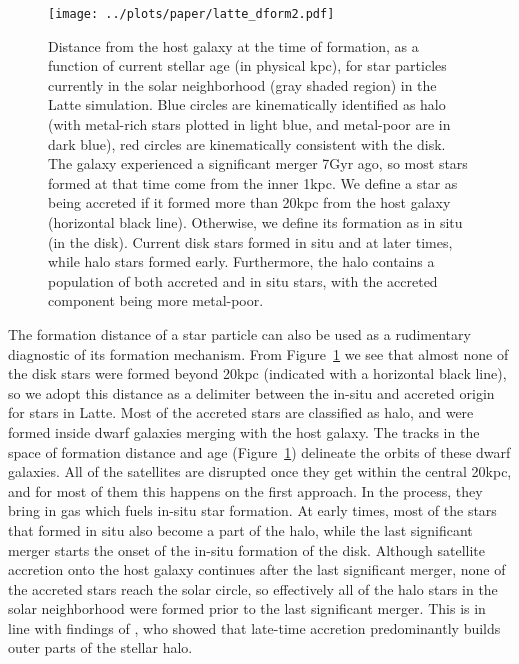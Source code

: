 \documentclass[apj, twocolappendix, numberedappendix, appendixfloats]{emulateapj}
\begin{document}
\begin{figure}
\begin{center}
\texttt{[image: ../plots/paper/latte\_dform2.pdf]}
\caption{Distance from the host galaxy at the time of formation, as a function of current stellar age (in physical kpc), for star particles currently in the solar neighborhood (gray shaded region) in the Latte simulation.
Blue circles are kinematically identified as halo (with metal-rich stars plotted in light blue, and metal-poor are in dark blue), red circles are kinematically consistent with the disk.
The galaxy experienced a significant merger 7\;Gyr ago, so most stars formed at that time come from the inner 1\;kpc.
We define a star as being accreted if it formed more than 20\;kpc from the host galaxy (horizontal black line).
Otherwise, we define its formation as in situ (in the disk).
Current disk stars formed in situ and at later times, while halo stars formed early.
Furthermore, the halo contains a population of both accreted and in situ stars, with the accreted component being more metal-poor.}
\label{fig:dform}
\end{center}
\end{figure}

The formation distance of a star particle can also be used as a rudimentary diagnostic of its formation mechanism.
From Figure~\ref{fig:dform} we see that almost none of the disk stars were formed beyond 20\;kpc (indicated with a horizontal black line), so we adopt this distance as a delimiter between the in-situ and accreted origin for stars in Latte.
Most of the accreted stars are classified as halo, and were formed inside dwarf galaxies merging with the host galaxy.
The tracks in the space of formation distance and age (Figure~\ref{fig:dform}) delineate the orbits of these dwarf galaxies.
All of the satellites are disrupted once they get within the central 20\;kpc, and for most of them this happens on the first approach.
In the process, they bring in gas which fuels in-situ star formation.
At early times, most of the stars that formed in situ also become a part of the halo, while the last significant merger starts the onset of the in-situ formation of the disk.
Although satellite accretion onto the host galaxy continues after the last significant merger, none of the accreted stars reach the solar circle, so effectively all of the halo stars in the solar neighborhood were formed prior to the last significant merger.
This is in line with findings of \citet{zolotov2009}, who showed that late-time accretion predominantly builds outer parts of the stellar halo.
\end{document}

